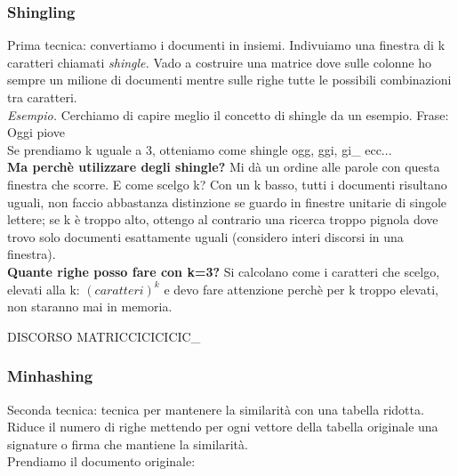 \subsubsection{Shingling}
Prima tecnica: convertiamo i documenti in insiemi. Indivuiamo una finestra di k caratteri chiamati \textit{shingle.} Vado a costruire una matrice dove sulle colonne ho sempre un milione di documenti mentre sulle righe tutte le possibili combinazioni tra caratteri. 
\\
\textit{Esempio.} Cerchiamo di capire meglio il concetto di shingle da un esempio. Frase: Oggi piove
\\
Se prendiamo k uguale a 3, otteniamo come shingle ogg, ggi, gi\_ ecc... 
\\
\textbf{Ma perchè utilizzare degli shingle?} Mi dà un ordine alle parole con questa finestra che scorre. E come scelgo k? Con un k basso, tutti i documenti risultano uguali, non faccio abbastanza distinzione se guardo in finestre unitarie di singole lettere; se k è troppo alto, ottengo al contrario una ricerca troppo pignola dove trovo solo documenti esattamente uguali (considero interi discorsi in una finestra). 
\\
\textbf{Quante righe posso fare con k=3?} Si calcolano come i caratteri che scelgo, elevati alla k: $(caratteri)^k$ e devo fare attenzione perchè per k troppo elevati, non staranno mai in memoria. 

DISCORSO MATRICCICICICIC_

\newpage

\subsubsection{Minhashing}
Seconda tecnica: tecnica per mantenere la similarità con una tabella ridotta. Riduce il numero di righe mettendo per ogni vettore della tabella originale una signature o firma che mantiene la similarità. 
\\
Prendiamo il documento originale: 